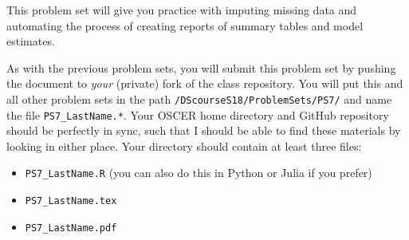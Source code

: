 \documentclass[12pt,english]{exam}
\begin{document}
This problem set will give you practice with imputing missing data and automating the process of creating reports of summary tables and model estimates.

As with the previous problem sets, you will submit this problem set by pushing the document to \emph{your} (private) fork of the class repository. You will put this and all other problem sets in the path \texttt{/DScourseS18/ProblemSets/PS7/} and name the file \texttt{PS7\_LastName.*}. Your OSCER home directory and GitHub repository should be perfectly in sync, such that I should be able to find these materials by looking in either place. Your directory should contain at least three files:
\begin{itemize}
    \item \texttt{PS7\_LastName.R} (you can also do this in Python or Julia if you prefer)
    \item \texttt{PS7\_LastName.tex}
    \item \texttt{PS7\_LastName.pdf}
\end{itemize}
\end{document}
